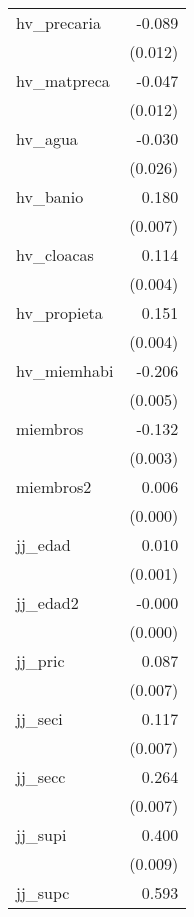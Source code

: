 {\begin{longtable}{l*{1}{D{.}{.}{-1}}}
\addlinespace
hv\_precaria &      -0.089\sym{***}\\
            &     (0.012)         \\
\addlinespace
hv\_matpreca &      -0.047\sym{***}\\
            &     (0.012)         \\
\addlinespace
hv\_agua     &      -0.030         \\
            &     (0.026)         \\
\addlinespace
hv\_banio    &       0.180\sym{***}\\
            &     (0.007)         \\
\addlinespace
hv\_cloacas  &       0.114\sym{***}\\
            &     (0.004)         \\
\addlinespace
hv\_propieta &       0.151\sym{***}\\
            &     (0.004)         \\
\addlinespace
hv\_miemhabi &      -0.206\sym{***}\\
            &     (0.005)         \\
\addlinespace
miembros    &      -0.132\sym{***}\\
            &     (0.003)         \\
\addlinespace
miembros2   &       0.006\sym{***}\\
            &     (0.000)         \\
\addlinespace
jj\_edad     &       0.010\sym{***}\\
            &     (0.001)         \\
\addlinespace
jj\_edad2    &      -0.000\sym{***}\\
            &     (0.000)         \\
\addlinespace
jj\_pric     &       0.087\sym{***}\\
            &     (0.007)         \\
\addlinespace
jj\_seci     &       0.117\sym{***}\\
            &     (0.007)         \\
\addlinespace
jj\_secc     &       0.264\sym{***}\\
            &     (0.007)         \\
\addlinespace
jj\_supi     &       0.400\sym{***}\\
            &     (0.009)         \\
\addlinespace
jj\_supc     &       0.593\sym{***}\\

\end{longtable}}
